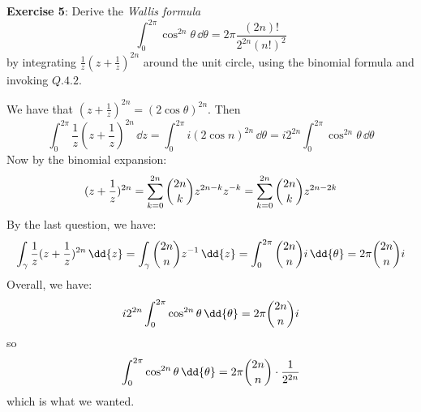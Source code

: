 \documentclass{article}
\begin{document}
\textbf{Exercise 5}: Derive the \textit{Wallis formula}
    \begin{equation*}
        \int_{0}^{2\pi} \cos^{2n}{\theta} \, \dd{\theta} = 2\pi\dfrac{(2n)!}{2^{2n}(n!)^{2}}
    \end{equation*}
by integrating $\frac{1}{z}(z + \frac{1}{z})^{2n}$ around the unit circle, using the binomial formula and invoking $Q.4.2$.
    \begin{answer}
        We have that $(z + \frac{1}{z})^{2n} = (2\cos{\theta})^{2n}$. Then 
            \begin{equation*}
                \int_{0}^{2\pi} \dfrac{1}{z}(z + \dfrac{1}{z})^{2n} \, \dd{z}  = \int_{0}^{2\pi} i(2\cos{n})^{2n} \, \dd{\theta} = i 2^{2n} \int_{0}^{2\pi} \cos^{2n}{\theta} \, \dd{\theta} 
            \end{equation*}
        Now by the binomial expansion:
            \begin{equation*}
                (z + \dfrac{1}{z})^{2n} = \sum_{k = 0}^{2n} \dbinom{2n}{k}z^{2n - k}z^{-k}= \sum_{k = 0}^{2n}\dbinom{2n}{k}z^{2n - 2k}
            \end{equation*}
        By the last question, we have:
            \begin{equation*}
                \int_{\gamma}^{} \dfrac{1}{z}(z + \dfrac{1}{z})^{2n} \, \dd{z} = \int_{\gamma}^{} \dbinom{2n}{n}z^{-1} \, \dd{z}  = \int_{0}^{2\pi} \dbinom{2n}{n}i \, \dd{\theta} = 2\pi \dbinom{2n}{n} i
            \end{equation*}
        Overall, we have:
            \begin{equation*}
                i2^{2n}\int_{0}^{2\pi} \cos^{2n}{\theta} \, \dd{\theta} = 2\pi \dbinom{2n}{n}i
            \end{equation*}
        so
            \begin{equation*}
                \int_{0}^{2\pi} \cos^{2n}{\theta} \, \dd{\theta} = 2\pi\dbinom{2n}{n}\cdot \dfrac{1}{2^{2n}}
            \end{equation*}
        which is what we wanted.
    \end{answer}

\newpage
\end{document}
